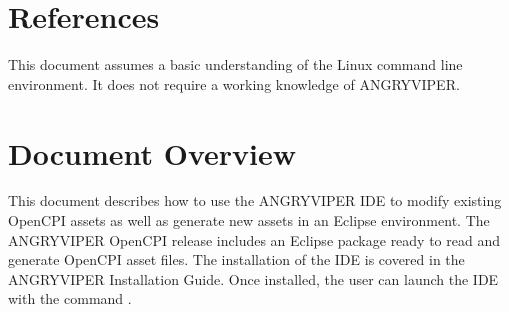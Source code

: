 \newpage

\tableofcontents

\newpage

\listoffigures

\newpage

\listoftables

\newpage

\section{References}

This document assumes a basic understanding of the Linux command line environment. It does not require a working knowledge of ANGRYVIPER.
\def\refcapbottom{}

\newpage

\section{Document Overview}
\label{sec:doc_overview}
\begin{flushleft}
This document describes how to use the ANGRYVIPER IDE to modify existing OpenCPI assets as well as generate new assets in an Eclipse environment. The ANGRYVIPER OpenCPI release includes an Eclipse package ready to read and generate OpenCPI asset files. The installation of the IDE is covered in the ANGRYVIPER Installation Guide. Once installed, the user can launch the IDE with the command .
\end{flushleft}


